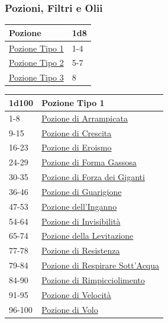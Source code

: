 \begin{multicols}{2}
{\subsubsection{Pozioni, Filtri e Olii}\hypertarget{pozionifiltri}{}\label{pozionifiltri}

{\small\begin{tabular}{ll}
		\toprule
\textbf{Pozione}&\textbf{1d8}\\
\toprule
\hyperlink{pozionifiltri}{Pozione Tipo 1} &1-4\\
\hyperlink{pozionifiltri}{Pozione Tipo 2} &5-7\\
\hyperlink{pozionifiltri}{Pozione Tipo 3} &8
\end{tabular}}

\medskip\hypertarget{Pozione Tipo 1}{}

{\small\begin{tabular}{ll}
		\toprule
\textbf{1d100} & \textbf{Pozione Tipo 1}\\
\toprule
1-8 & \hyperlink{PozionediArrampicata}{Pozione di Arrampicata}\\
9-15 & \hyperlink{PozionediCrescita}{Pozione di Crescita}\\
16-23 & \hyperlink{PozionediEroismo}{Pozione di Eroismo}\\
24-29 & \hyperlink{PozionediFormaGassosa}{Pozione di Forma Gassosa}\\
30-35 & \hyperlink{PozionediForzadeiGiganti}{Pozione di Forza dei Giganti}\\
36-46 & \hyperlink{PozionediGuarigione}{Pozione di Guarigione}\\
47-53 & \hyperlink{Pozionedell'Inganno}{Pozione dell'Inganno}\\
54-64 & \hyperlink{PozionediInvisibilità}{Pozione di Invisibilità}\\
65-74 & \hyperlink{PozionedellaLevitazione}{Pozione della Levitazione}\\
77-78 & \hyperlink{PozionediResistenza}{Pozione di Resistenza}\\
79-84 & \hyperlink{PozionediRespirareSott'Acqua}{Pozione di Respirare Sott'Acqua}\\
84-90 & \hyperlink{PozionediRimpicciolimento}{Pozione di Rimpicciolimento}\\
91-95 & \hyperlink{PozionediVelocità}{Pozione di Velocità}\\
96-100 & \hyperlink{PozionediVolo}{Pozione di Volo}
\end{tabular}}

}
\end{multicols}
